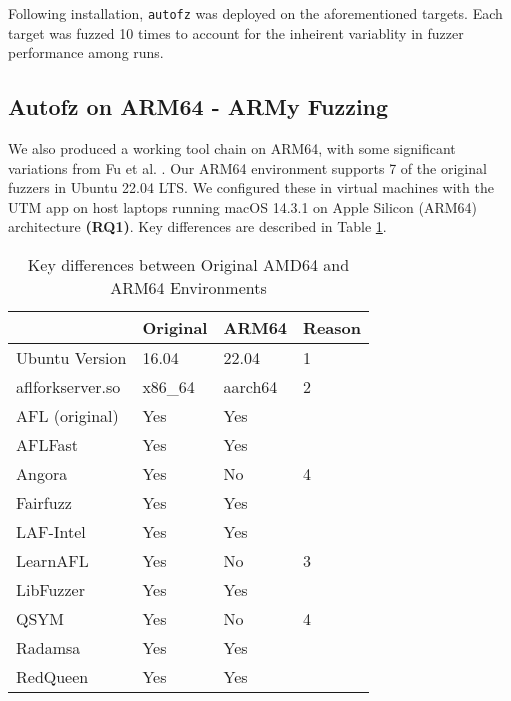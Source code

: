 Following installation, \texttt{autofz} was deployed on the aforementioned targets. Each 
target was fuzzed 10 times to account for the inheirent variablity in fuzzer performance among runs. 

\subsection{Autofz on ARM64 - ARMy Fuzzing}

We also produced a working tool chain on ARM64, with some significant 
variations from Fu et al. \cite{fu_autofz_2023}. Our ARM64 environment supports 7 of 
the original fuzzers in Ubuntu 22.04 LTS. We configured these in virtual machines 
with the UTM app on host laptops running macOS 14.3.1 on Apple Silicon (ARM64) 
architecture \textbf{(RQ1)}. Key differences are described in Table \ref{arm64-characteristics}.

\begin{table}[ht]
    \begin{tabular}{|l|l|l|l|}
        \hline
                        & Original\cite{fu_autofz_2023} & ARM64 & Reason \\
        \hline
        Ubuntu Version  & 16.04             & 22.04 & 1 \\
        \hline
        aflforkserver.so    & x86\_64           & aarch64 & 2 \\
        \hline
        AFL (original)  & Yes               & Yes & \\
        \hline
        AFLFast         & Yes               & Yes & \\
        \hline
        Angora          & Yes               & No & 4 \\
        \hline
        Fairfuzz        & Yes               & Yes & \\
        \hline
        LAF-Intel       & Yes               & Yes & \\
        \hline
        LearnAFL        & Yes               & No & 3 \\
        \hline
        LibFuzzer       & Yes               & Yes & \\
        \hline
        QSYM            & Yes               & No & 4 \\
        \hline
        Radamsa         & Yes               & Yes & \\
        \hline
        RedQueen        & Yes               & Yes & \\
        \hline
    \end{tabular}
    \caption{Key differences between Original AMD64 and ARM64 Environments}
    \label{arm64-characteristics}
\end{table}

